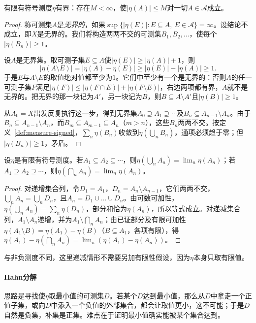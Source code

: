 \begin{lemma}[有限有符号测度有界]
\label{lem:measure-signed-bounded}
有限有符号测度$\eta$有界：存在$M<\infty$，使$|\eta(A)|\le M$对一切$A\in\mathcal A$成立。
\end{lemma}

\begin{proof}
称可测集$A$是\emph{无界的}，如果$\sup\{|\eta(E)|:E\subseteq A,\ E\in\mathcal A\}=\infty$。设结论不成立，即$X$是无界的。我们将构造两两不交的可测集$B_1,B_2,\dots$，使每个$|\eta(B_n)|\ge1$。

设$A$是无界集。取可测子集$E\subseteq A$使$|\eta(E)|\ge|\eta(A)|+1$，则
\[
 |\eta(A\setminus E)|=|\eta(A)-\eta(E)|\ge|\eta(E)|-|\eta(A)|\ge1 .
\]
于是$E$与$A\setminus E$的取值绝对值都至少为$1$。它们中至少有一个是无界的：否则$A$的任一可测子集$F$满足$|\eta(F)|\le|\eta(F\cap E)|+|\eta(F\setminus E)|$，右边两项都有界，$A$就不是无界的。把无界的那一块记为$A'$，另一块记为$B$，则$B\subseteq A\setminus A'$且$|\eta(B)|\ge1$。

从$A_0=X$出发反复执行这一步，得到无界集$A_0\supseteq A_1\supseteq\cdots$及$B_n\subseteq A_{n-1}\setminus A_n$。由于$B_n\subseteq A_{n-1}\setminus A_n$，而$B_m\subseteq A_{m-1}\subseteq A_n$（$m>n$），这些$B_n$两两不交。按定义~\ref{def:measure-signed}，$\sum_n\eta(B_n)$收敛到$\eta(\bigcup_nB_n)$，通项必须趋于零；但$|\eta(B_n)|\ge1$，矛盾。
\end{proof}

\begin{lemma}[有符号测度的单调连续性]
\label{lem:measure-signed-continuity}
设$\eta$是有限有符号测度。若$A_1\subseteq A_2\subseteq\cdots$，则$\eta(\bigcup_nA_n)=\lim_n\eta(A_n)$；若$A_1\supseteq A_2\supseteq\cdots$，则$\eta(\bigcap_nA_n)=\lim_n\eta(A_n)$。
\end{lemma}

\begin{proof}
对递增集合列，令$D_1=A_1$，$D_n=A_n\setminus A_{n-1}$，它们两两不交，$\bigcup_nA_n=\bigcup_nD_n$，且$A_n=D_1\cup\dots\cup D_n$。由可数可加性，$\eta(\bigcup_nA_n)=\sum_n\eta(D_n)$，部分和恰为$\eta(A_n)$，所以等式成立。对递减集合列，$A_1\setminus A_n$递增，并为$A_1\setminus\bigcap_nA_n$；由已证部分及有限可加性$\eta(A_1\setminus B)=\eta(A_1)-\eta(B)$（$B\subseteq A_1$，各项有限），得$\eta(A_1)-\eta(\bigcap_nA_n)=\lim_n(\eta(A_1)-\eta(A_n))$。
\end{proof}

与非负测度不同，这里递减情形不需要另加有限性假设，因为$\eta$本身只取有限值。

\paragraph{Hahn分解}
思路是寻找使$\eta$取最小值的可测集$D$。若某个$D$达到最小值，那么从$D$中拿走一个正值子集，或向$D$中添入一个负值的外部集合，都会让取值更小，这不可能；于是$D$自然是负集，补集是正集。难点在于证明最小值确实能被某个集合达到。

